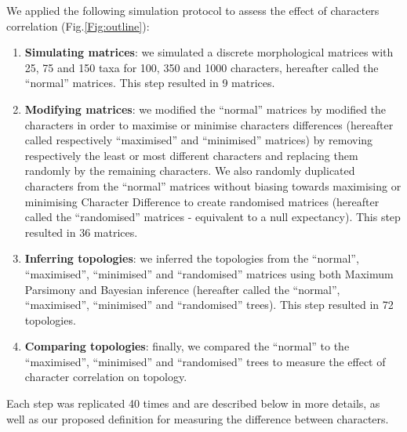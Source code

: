 \documentclass[12pt,letterpaper]{article}
\begin{document}
We applied the following simulation protocol to assess the effect of characters correlation (Fig.\ref{Fig:outline}):
\begin{enumerate}
    \item \textbf{Simulating matrices}: we simulated a discrete morphological matrices with 25, 75 and 150 taxa for 100, 350 and 1000 characters, hereafter called the ``normal'' matrices. This step resulted in 9 matrices.
    \item \textbf{Modifying matrices}: we modified the ``normal'' matrices by modified the characters in order to maximise or minimise characters differences (hereafter called respectively ``maximised'' and ``minimised'' matrices) by removing respectively the least or most different characters and replacing them randomly by the remaining characters.
    We also randomly duplicated characters from the ``normal'' matrices without biasing towards maximising or minimising Character Difference to create randomised matrices (hereafter called the ``randomised'' matrices - equivalent to a null expectancy). This step resulted in 36 matrices.
    \item \textbf{Inferring topologies}: we inferred the topologies from the ``normal'', ``maximised'', ``minimised'' and ``randomised'' matrices using both Maximum Parsimony and Bayesian inference (hereafter called the ``normal'', ``maximised'', ``minimised'' and ``randomised'' trees). This step resulted in 72 topologies.
    \item \textbf{Comparing topologies}: finally, we compared the ``normal'' to the ``maximised'', ``minimised'' and ``randomised'' trees to measure the effect of character correlation on topology.
\end{enumerate}
Each step was replicated 40 times and are described below in more details, as well as our proposed definition for measuring the difference between characters.
\end{document}
